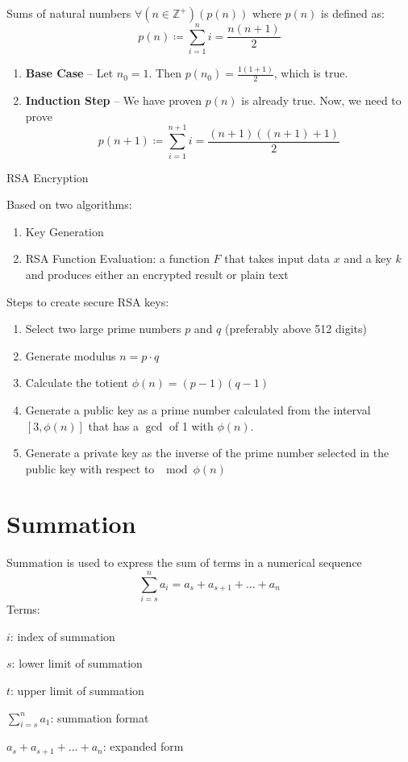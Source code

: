 \documentclass[12pt]{report}
\begin{document}
\begin{exbox}{Sums of natural numbers}
	$\forall(n \in \mathbb{Z}^+)(p(n))$ where $p(n)$ is defined as:
	$$p(n) \coloneq \sum_{i=1}^{n}i = \frac{n(n+1)}{2}$$
	\begin{enumerate}
		\item \textbf{Base Case} -- Let $n_0=1$. Then $p(n_0)=\frac{1(1+1)}{2}$, which is true.
		\item \textbf{Induction Step} -- We have proven $p(n)$ is already true. Now, we need to prove $$p(n+1) \coloneq \sum_{i=1}^{n+1}i = \frac{(n+1)((n+1)+1)}{2}$$ 
	\end{enumerate}
\end{exbox}

\begin{dfnbox}{RSA Encryption}
	
\end{dfnbox}

Based on two algorithms:

\begin{enumerate}
	\item Key Generation
	\item RSA Function Evaluation: a function $F$ that takes input data $x$ and a key $k$ and produces either an encrypted result or plain text
\end{enumerate}

Steps to create secure RSA keys:
\begin{enumerate}
	\item Select two large prime numbers $p$ and $q$ (preferably above 512 digits)
	\item Generate modulus $n = p \cdot q$
	\item Calculate the totient $\phi (n) = (p-1) (q-1)$
	\item Generate a public key as a prime number calculated from the interval $[ 3, \phi(n) ]$ that has a $\gcd$ of 1 with $\phi(n)$.
	\item Generate a private key as the inverse of the prime number selected in the public key with respect to $\mod \phi(n)$
\end{enumerate}

\newpage
\chapter{Summation}
\begin{dfnbox}{Summation}
	 is used to express the sum of terms in a numerical sequence
	$$\sum_{i=s}^{n}a_i = a_s + a_{s+1} + \ldots + a_n$$
	Terms:
	\begin{dfnitems}
		\item $i$: index of summation
		\item $s$: lower limit of summation
		\item $t$: upper limit of summation
		\item $\sum_{i=s}^{n}a_1$: summation format
		\item $a_s+a_{s+1}+\ldots+a_n$: expanded form
	\end{dfnitems}
\end{dfnbox}
\end{document}
